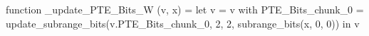 function _update_PTE_Bits_W (v, x) = let v = { v with PTE_Bits_chunk_0 = update_subrange_bits(v.PTE_Bits_chunk_0, 2, 2, subrange_bits(x, 0, 0)) } in
  v
